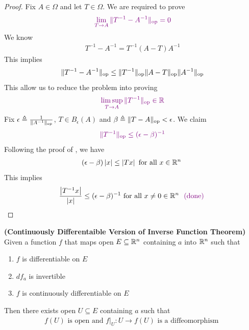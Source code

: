 \documentclass{report}
\begin{document}
\begin{proof}
Fix $A\in \Omega$ and let $T \in \Omega$. We are required to prove 
\begin{align*}
  \textcolor{violet}{\lim_{T\to A} \| T^{-1}-A^{-1} \|_\text{op}=0}
\end{align*}
We know 
\begin{align*}
T^{-1}-A^{-1}=T^{-1}(A-T)A^{-1}
\end{align*}
This implies 
\begin{align*}
\| T^{-1}-A^{-1} \|_\text{op}\leq \| T^{-1} \|_\text{op} \| A-T \|_\text{op} \| A^{-1} \|_\text{op}
\end{align*}
This allow us to reduce the problem into proving 
\begin{align*}
  \textcolor{violet}{\limsup_{T\to A} \| T^{-1} \|_\text{op}\in\mathbb{R}}
\end{align*}
Fix  $\epsilon \triangleq \frac{1}{\| A^{-1} \|_\text{op}}$, $T \in B_\epsilon (A)$ and $\beta \triangleq \| T-A \|_\text{op}< \epsilon $. We claim 
\begin{align*}
  \textcolor{violet}{\| T^{-1} \|_\text{op} \leq  (\epsilon -\beta )^{-1}}
\end{align*}
Following the proof of , we have 
\begin{align*}
  (\epsilon - \beta )\left|x\right|\leq \left|Tx\right|\text{ for all $x\in\mathbb{R}^n$ }
\end{align*}
This implies 
\begin{align*}
  \frac{\left|T^{-1}x\right|}{\left|x\right|}\leq (\epsilon -\beta )^{-1}\text{ for all $x\neq 0 \in\mathbb{R}^n$ }\textcolor{violet}{\text{ (done) }}
\end{align*}
\end{proof}
\begin{corollary}
\textbf{(Continuously Differentaible Version of Inverse Function Theorem)} Given a function $f$ that maps open $E\subseteq \mathbb{R}^n$ containing $a$  into $\mathbb{R}^n$ such that 
\begin{enumerate}[label=(\alph*)]
  \item $f$ is differentiable on $E$  
  \item $df_a$ is invertible 
   \item $f$ is continuously differentiable on $E$
\end{enumerate}
Then there exists open $U\subseteq E$ containing $a$ such that 
\begin{align*}
f(U)\text{ is open and }f|_U:U\to f(U)\text{ is a diffeomorphism }
\end{align*}
\end{corollary}
\end{document}
